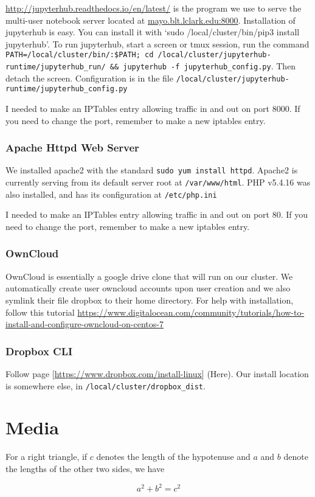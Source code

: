 \documentclass[]{book}
\theoremstyle{definition}
\theoremstyle{definition}
\theoremstyle{definition}
\theoremstyle{remark}
\let\BeginKnitrBlock\begin \let\EndKnitrBlock\end
\begin{document}
\href{Jupyterhub}{http://jupyterhub.readthedocs.io/en/latest/} is the
program we use to serve the multi-user notebook server located at
\url{mayo.blt.lclark.edu:8000}. Installation of jupyterhub is easy. You
can install it with `sudo /local/cluster/bin/pip3 install jupyterhub'.
To run jupyterhub, start a screen or tmux session, run the command
\texttt{PATH=/local/cluster/bin/:\$PATH;\ cd\ /local/cluster/jupyterhub-runtime/jupyterhub\_run/\ \&\&\ jupyterhub\ -f\ jupyterhub\_config.py}.
Then detach the screen. Configuration is in the file
\texttt{/local/cluster/jupyterhub-runtime/jupyterhub\_config.py}

I needed to make an IPTables entry allowing traffic in and out on port
8000. If you need to change the port, remember to make a new iptables
entry.

\subsection{Apache Httpd Web Server}\label{apache-httpd-web-server}

We installed apache2 with the standard
\texttt{sudo\ yum\ install\ httpd}. Apache2 is currently serving from
its default server root at \texttt{/var/www/html}. PHP v5.4.16 was also
installed, and has its configuration at \texttt{/etc/php.ini}

I needed to make an IPTables entry allowing traffic in and out on port
80. If you need to change the port, remember to make a new iptables
entry.

\subsection{OwnCloud}\label{owncloud}

OwnCloud is essentially a google drive clone that will run on our
cluster. We automatically create user owncloud accounts upon user
creation and we also symlink their file dropbox to their home directory.
For help with installation, follow this tutorial
\href{Here}{https://www.digitalocean.com/community/tutorials/how-to-install-and-configure-owncloud-on-centos-7}

\subsection{Dropbox CLI}\label{dropbox-cli}

Follow page {[}\url{https://www.dropbox.com/install-linux}{]} (Here).
Our install location is somewhere else, in
\texttt{/local/cluster/dropbox\_dist}.

\chapter{Media}\label{media}

\BeginKnitrBlock{theorem}[Pythagorean theorem]
\protect\hypertarget{thm:pyth}{}{\label{thm:pyth} \iffalse (Pythagorean
theorem) \fi{} }For a right triangle, if \(c\) denotes the length of the
hypotenuse and \(a\) and \(b\) denote the lengths of the other two
sides, we have

\[a^2 + b^2 = c^2\]
\EndKnitrBlock{theorem}


\end{document}
